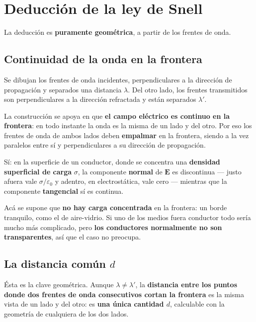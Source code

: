 \documentclass[12pt,a4paper]{article}
\begin{document}
\section{Deducción de la ley de Snell}

La deducción es \textbf{puramente geométrica}, a partir de los frentes de onda.

\subsection{Continuidad de la onda en la frontera}

Se dibujan los frentes de onda incidentes, perpendiculares a la dirección de
propagación y separados una distancia $\lambda$. Del otro lado, los frentes
transmitidos son perpendiculares a la dirección refractada y están separados
$\lambda'$.

La construcción se apoya en que \textbf{el campo eléctrico es continuo en la
frontera}: en todo instante la onda es la misma de un lado y del otro. Por eso
los frentes de onda de ambos lados deben \textbf{empalmar} en la frontera, siendo
a la vez paralelos entre sí y perpendiculares a su dirección de propagación.

\begin{warnbox}
Sí: en la superficie de un conductor, donde se concentra una \textbf{densidad
superficial de carga} $\sigma$, la componente \textbf{normal} de $\mathbf{E}$ es
discontinua --- justo afuera vale $\sigma/\varepsilon_0$ y adentro, en
electrostática, vale cero --- mientras que la componente \textbf{tangencial} sí
es continua.

Acá se supone que \textbf{no hay carga concentrada} en la frontera: un borde
tranquilo, como el de aire-vidrio. Si uno de los medios fuera conductor todo
sería mucho más complicado, pero \textbf{los conductores normalmente no son
transparentes}, así que el caso no preocupa.
\end{warnbox}

\subsection{La distancia común $d$}

Ésta es la clave geométrica. Aunque $\lambda \neq \lambda'$, la \textbf{distancia
entre los puntos donde dos frentes de onda consecutivos cortan la frontera} es la
misma vista de un lado y del otro: es \textbf{una única cantidad $d$}, calculable
con la geometría de cualquiera de los dos lados.
\end{document}
